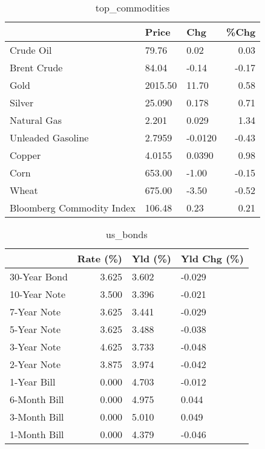 \documentclass{article}%
\begin{document}
\begin{table}[htbp]%
\caption{top\_commodities}%
\centering%
\begin{adjustbox}{width=1\textwidth}%
\begin{tabular}{lllr}
\toprule
                          &   Price &     Chg &  \%Chg \\
\midrule
               Crude Oil  &   79.76 &    0.02 &  0.03 \\
             Brent Crude  &   84.04 &   -0.14 & -0.17 \\
                    Gold  & 2015.50 &   11.70 &  0.58 \\
                  Silver  &  25.090 &   0.178 &  0.71 \\
             Natural Gas  &   2.201 &   0.029 &  1.34 \\
       Unleaded Gasoline  &  2.7959 & -0.0120 & -0.43 \\
                  Copper  &  4.0155 &  0.0390 &  0.98 \\
                    Corn  &  653.00 &   -1.00 & -0.15 \\
                   Wheat  &  675.00 &   -3.50 & -0.52 \\
Bloomberg Commodity Index &  106.48 &    0.23 &  0.21 \\
\bottomrule
\end{tabular}
%
\end{adjustbox}%
\end{table}

%


\begin{table}[htbp]%
\caption{us\_bonds}%
\centering%
\begin{adjustbox}{width=1\textwidth}%
\begin{tabular}{lrll}
\toprule
             &  Rate (\%) & Yld (\%) & Yld Chg (\%) \\
\midrule
30-Year Bond &     3.625 &   3.602 &      -0.029 \\
10-Year Note &     3.500 &   3.396 &      -0.021 \\
 7-Year Note &     3.625 &   3.441 &      -0.029 \\
 5-Year Note &     3.625 &   3.488 &      -0.038 \\
 3-Year Note &     4.625 &   3.733 &      -0.048 \\
 2-Year Note &     3.875 &   3.974 &      -0.042 \\
 1-Year Bill &     0.000 &   4.703 &      -0.012 \\
6-Month Bill &     0.000 &   4.975 &       0.044 \\
3-Month Bill &     0.000 &   5.010 &       0.049 \\
1-Month Bill &     0.000 &   4.379 &      -0.046 \\
\bottomrule
\end{tabular}
%
\end{adjustbox}%
\end{table}
\end{document}
